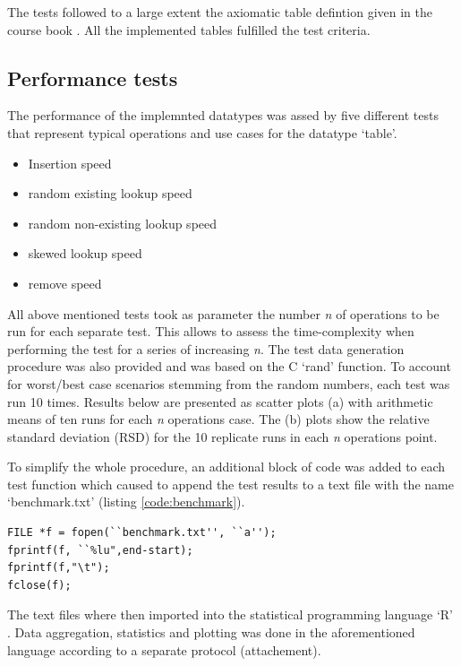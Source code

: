 \documentclass[a4paper,11pt,twoside]{article}
\begin{document}
The tests followed to a large extent the axiomatic table defintion given
in the course book \cite[p 122]{janlert2000}. All the implemented
tables fulfilled the test criteria.

\subsection{Performance tests}
The performance of the implemnted datatypes was assed by five
different tests that represent typical operations and use cases for
the datatype `table'. 

\begin{itemize}
\item Insertion speed
\item random existing lookup speed
\item random non-existing lookup speed 
\item skewed lookup speed
\item remove speed  
\end{itemize}

All above mentioned tests took as parameter the number \textit {n} 
of operations to be run for each separate test. This allows to assess the
time-complexity when performing the test for a series of increasing
\textit{n}. The test data generation procedure was also provided and
was based on the C `rand' function. To account for worst/best case
scenarios stemming from the random numbers, each test was run 10
times. Results below are presented as scatter plots (a) with
arithmetic means of ten runs for each \textit{n} operations case. 
The (b) plots show the relative standard deviation (RSD) for the 10
replicate runs in each \textit{n} operations point.  

To simplify the whole procedure, an additional block of code was added
to each test function which caused to append the test results to a text
file with the name `benchmark.txt' (listing \ref{code:benchmark}).

\begin{lstlisting}[label=code:benchmark,caption=code block for writing
  benchmark data to file]
FILE *f = fopen(``benchmark.txt'', ``a'');
fprintf(f, ``%lu",end-start);
fprintf(f,"\t");
fclose(f);
\end{lstlisting}

The text files where then imported into the statistical programming language `R'
\cite{rlanguage}. Data aggregation, statistics and plotting was done
in the aforementioned language according to a separate protocol
(attachement).
\end{document}
